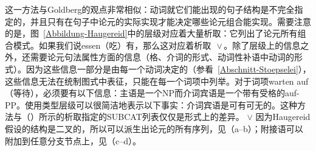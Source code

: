 \begin{exe}
\begin{xlist}[iv.]
\begin{exe}
\begin{xlist}[iv.]
这一方法与Goldberg的观点非常相似：动词就它们能出现的句子结构是不完全指定的，并且只有在句子中论元的实际实现才能决定哪些论元组合能实现。需要注意的是，图~\ref{Abbildung-Haugereid}中的层级对应着大量析取：它列出了论元所有组合模式。如果我们说essen（吃）有，那么这对应着析取\,~$\vee$\,。除了层级上的信息之外，还需要论元句法属性方面的信息（格、介词的形式、动词性补语中动词的形式）。因为这些信息一部分是由每一个动词决定的（参看~\ref{Abschnitt-Stoepselei}），这些信息无法在统制图式中表征，只能在每一个词项中列举。对于词项warten auf（等待），必须要有以下信息：主语是一个NP而介词宾语是一个带有受格的auf-PP。使用类型层级可以很简洁地表示以下事实：介词宾语是可有可无的。这种方法与（）所示的析取指定的SUBCAT列表仅仅是形式上的差异。
\ea
\subcat {} $\vee$ 
\z
%
因为Haugereid假设的结构是二叉的，所以可以派生出论元的所有序列，见（a--b）；附接语可以附加到任意分支节点上，见（c--d）。

\end{xlist}
\end{exe}
\end{xlist}
\end{exe}
